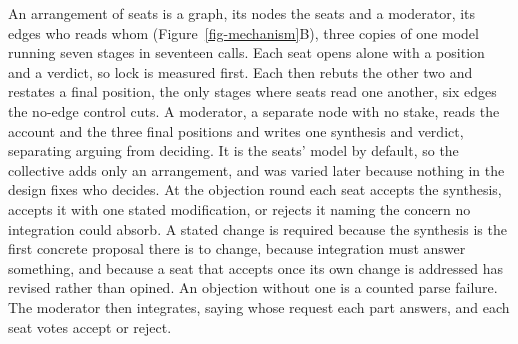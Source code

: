 An arrangement of seats is a graph, its nodes the seats and a moderator,
its edges who reads whom (Figure~\ref{fig-mechanism}B), three copies of
one model running seven stages in seventeen
calls. %
Each seat opens alone with a position and a verdict, so lock is measured
first. %
Each then rebuts the other two and restates a final position, the only
stages where seats read one another, six edges the no-edge control
cuts. %
A moderator, a separate node with no stake, reads the account and the
three final positions and writes one synthesis and verdict, separating
arguing from
deciding. %
It is the seats' model by default, so the collective adds only an
arrangement, and was varied later because nothing in the design fixes who
decides. %
At the objection round each seat accepts the synthesis, accepts it with
one stated modification, or rejects it naming the concern no integration
could
absorb. %
A stated change is required because the synthesis is the first concrete
proposal there is to change, because integration must answer something,
and because a seat that accepts once its own change is addressed has
revised rather than opined. An objection without one is a counted
parse
failure. %
The moderator then integrates, saying whose request each part answers,
and each seat votes accept or
reject. %


